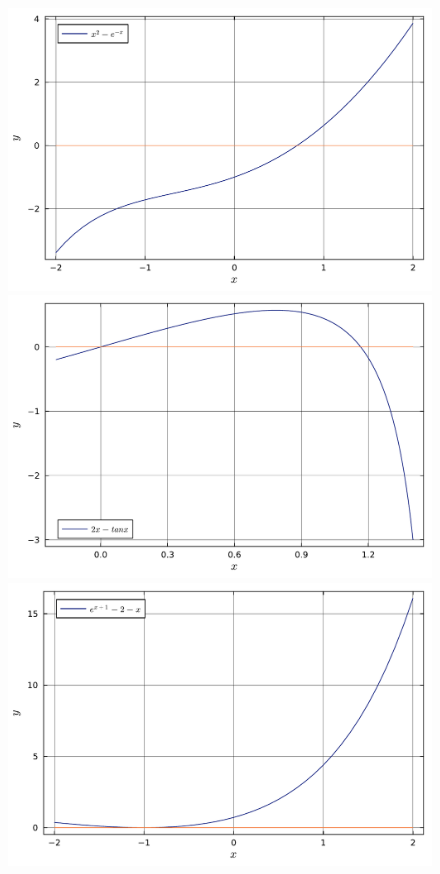 \documentclass[letterpaper, 12pt]{article}
\numberwithin{equation}{section}    %
\begin{document}
\begin{figure}[!ht]
    \centering
    \begin{minipage}[b]{0.47\textwidth}
        \includegraphics[width=\textwidth]{3321.pdf}
        \caption*{}
    \end{minipage}
    \hspace{0.5cm}
    \begin{minipage}[b]{0.47\textwidth}
        \includegraphics[width=\textwidth]{3322.pdf}
        \caption*{}
    \end{minipage}
    \vspace{0.001cm}
    \begin{minipage}[b]{0.47\textwidth}
        \includegraphics[width=\textwidth]{3323.pdf}

\end{minipage}
\end{figure}
\end{document}
